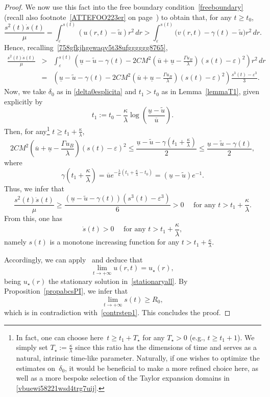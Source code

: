 \documentclass[12pt,a4paper,intlimits,sumlimits]{amsart}
\theoremstyle{definition}
\theoremstyle{plain}
\numberwithin{equation}{section}
\renewcommand{\leq}{\leqslant}
\renewcommand{\geq}{\geqslant}
\renewcommand{\ge}{\geqslant}
\begin{document}
\begin{proof}
We now use this fact into the free boundary condition~\eqref{freeboundary} (recall also footnote~\ref{ATTEFOO223er} on page~\pageref{ATTEFOO223er})
to obtain that, for any $t\ge t_0$,
$$ \frac{ s^2(t) \dot{s}(t)}{\mu}  =\int_{\varepsilon}^{s(t)} (u(r, t)-\widetilde u) r^2 \,dr > \int_{\varepsilon}^{s(t)} \big(v(r, t)-\gamma(t)-\widetilde u\big) r^2 \,dr .$$
Hence, recalling~\eqref{758gfkjhgewaqy5t38ufgggggg8765},
\begin{eqnarray*}\frac{s^2(t) \dot{s}(t)}{\mu} &>& \int_{\varepsilon}^{s(t)}
\left( \underline{u}-\widetilde u-\gamma(t)-2CM^2\left(\overline u+\underline u -\frac{\Gamma u_B}{\lambda}\right)(s(t)-\varepsilon)^2\right) r^2 \,dr\\&=&
\left( \underline{u}-\widetilde u-\gamma(t)-2CM^2\left(\overline u+\underline u -\frac{\Gamma u_B}{\lambda}\right)(s(t)-\varepsilon)^2\right) \frac{s^3(t)-\varepsilon^3}3.
\end{eqnarray*}
Now, we take $\delta_0$ as in \eqref{delta0esplicita} and  $t_1>t_0$ as in Lemma~\ref{lemmaT1}, given explicitly by
\[
t_1:= t_0 -\frac{\kappa}{\lambda}\log\left(\frac{\underline{u} -\widetilde u}{\overline{u}}\right).
\]
Then, for any\footnote{In fact, one can choose here~\(t\ge t_1+T_\star\) for any \(T_\star>0\) (e.g., \(t\ge t_1+1\)). We simply set \(T_\star := \frac{\kappa}{\lambda}\) since this ratio has the dimensions of time and serves as a natural, intrinsic time-like parameter. Naturally, if one wishes to optimize the estimates on~\(\delta _{0}\), it would be beneficial to make a more refined choice here, as well as a more bespoke selection of the Taylor expansion domains in \eqref{vbuewi58221wsd4trg7uij}.}
$t\ge t_1+{\frac{\kappa}{\lambda}}$,
\[
2CM^2\left(\overline u+\underline u -\frac{\Gamma u_B}{\lambda}\right)(s(t)-\varepsilon)^2\leq \frac{\underline{u}-\widetilde u-\gamma\left(t_1+{\frac{\kappa}{\lambda}}\right)}{2}\leq \frac{\underline{u}-\widetilde u-\gamma(t)}{2},
\]
where
\[
\gamma\left(t_1+{\frac{\kappa}{\lambda}}\right)=\overline u e^{-\frac{\lambda}{\kappa}\left(t_1+{\frac{\kappa}{\lambda}}-t_0\right)}
=(\underline u-\widetilde u)e^{-1}.
\]
Thus, we infer that 
\[
\frac{ s^2(t) \dot{s}(t)}{\mu}\geq \frac{(\underline{u}-\widetilde u-\gamma(t))(s^3(t)-\varepsilon^3)}{6}
>0\quad\mbox{ for any } t> t_1+{\frac{\kappa}{\lambda}}.
\]
From this, one has
\[
\dot{s}(t)>0\quad\mbox{ for any } t> t_1+{\frac{\kappa}{\lambda}},
\]
namely $s(t)$ is a monotone increasing function for any $t> t_1+{\frac{\kappa}{\lambda}}$.  

Accordingly, we can apply~\cite[Chapter~6, Theorem~2]{MR181836} and deduce that
\[
\lim_{t\to+\infty} u(r, t) = u_\star(r),
\]
being $u_\star(r)$ the stationary solution in~\eqref{stationaryall}.
By Proposition~\ref{propabcsPI}, we infer that
\[
\lim_{t\to+\infty} s(t)\ge R_0,
\]
which is in contradiction with~\eqref{contrstep1}. This concludes the proof.
\end{proof}
\end{document}
